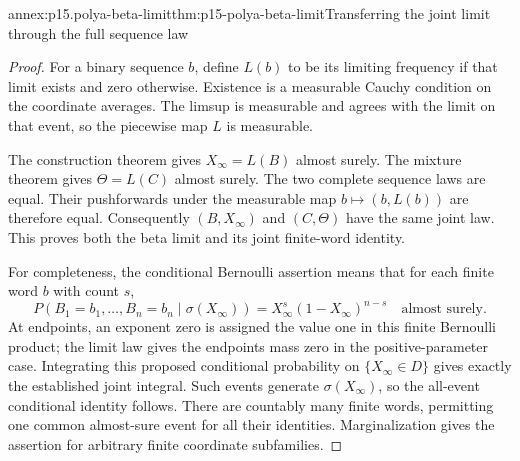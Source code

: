 \begin{annexitem}{annex:p15.polya-beta-limit}{thm:p15-polya-beta-limit}{Transferring the joint limit through the full sequence law}
\begin{proof}
For a binary sequence \(b\), define \(L(b)\) to be its limiting
frequency if that limit exists and zero otherwise.
Existence is a measurable Cauchy condition on the coordinate averages.
The limsup is measurable and agrees with the limit on that event,
so the piecewise map \(L\) is measurable.

The construction theorem gives \(X_\infty=L(B)\) almost surely.
The mixture theorem gives \(\Theta=L(C)\) almost surely.
The two complete sequence laws are equal. Their pushforwards under
the measurable map \(b\mapsto(b,L(b))\) are therefore equal.
Consequently \((B,X_\infty)\) and \((C,\Theta)\) have the same
joint law. This proves both the beta limit and its joint finite-word
identity.

For completeness, the conditional Bernoulli assertion means that
for each finite word \(b\) with count \(s\),
\[
 P(B_1=b_1,\ldots,B_n=b_n\mid\sigma(X_\infty))
                =X_\infty^s(1-X_\infty)^{n-s}
                         \quad\text{almost surely}.
\]
At endpoints, an exponent zero is assigned the value one in this
finite Bernoulli product; the limit law gives the endpoints mass zero
in the positive-parameter case. Integrating this proposed conditional
probability on \(\{X_\infty\in D\}\) gives exactly the established
joint integral. Such events generate \(\sigma(X_\infty)\), so the
all-event conditional identity follows. There are countably many
finite words, permitting one common almost-sure event for all their
identities. Marginalization gives the assertion for arbitrary finite
coordinate subfamilies.
\end{proof}
\end{annexitem}

